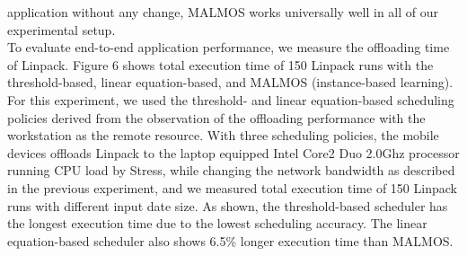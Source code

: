 \documentclass[10pt, conference, compsocconf]{IEEEtran}
\begin{document}
{{application without any change, MALMOS works universally well in all of
our experimental setup.\\
%
\indent To evaluate end-to-end application performance, we measure the
offloading time of Linpack.
%
Figure 6 shows total execution time of 150 Linpack runs with
the threshold-based, linear equation-based, and MALMOS (instance-based
learning).
%
For this experiment, we used the threshold- and linear equation-based
scheduling policies derived from the observation of the offloading
performance with the workstation as the remote resource.
%
With three scheduling policies, the mobile devices offloads Linpack to
the laptop equipped Intel Core2 Duo 2.0Ghz processor running CPU load by
Stress, while changing the network bandwidth as described in the previous 
experiment, and we measured total execution time of 150 Linpack runs with 
different input date size. 
%
As shown, the threshold-based scheduler has the longest execution
time due to the lowest scheduling accuracy.
%
The linear equation-based scheduler also shows 6.5\% longer execution
time than MALMOS. 
%
%
%
%
%
%
%
%
%
%
%
%
}}
\end{document}
